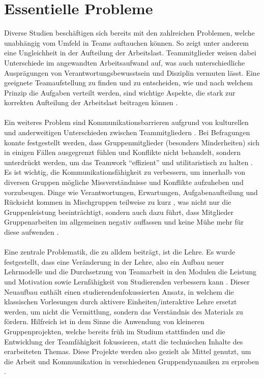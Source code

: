 \documentclass[a4paper]{article}
\begin{document}
\section{Essentielle Probleme}
Diverse Studien beschäftigen sich bereits mit den zahlreichen Problemen, welche unabhängig vom Umfeld in Teams auftauchen können. So zeigt \cite{balanced_teamwork_scrum} unter anderem eine Ungleichheit in der Aufteilung der Arbeitslast. Teammitglieder weisen dabei Unterschiede im angewandten Arbeitsaufwand auf, was auch unterschiedliche Ausprägungen von Verantwortungsbewusstsein und Disziplin vermuten lässt. Eine geeignete Teamaufstellung zu finden und zu entscheiden, wie und nach welchem Prinzip die Aufgaben verteilt werden, sind wichtige Aspekte, die stark zur korrekten Aufteilung der Arbeitslast beitragen können \cite{teamworkstrat_firstsem_engineering}.
\\\\
Ein weiteres Problem sind Kommunikationsbarrieren aufgrund von kulturellen und anderweitigen Unterschieden zwischen Teammitgliedern \cite{Multicultural_miscommunication}. Bei Befragungen konnte festgestellt werden, dass Gruppenmitglieder (besonders Minderheiten) sich in einigen Fällen ausgegrenzt fühlen und Konflikte nicht behandelt, sondern unterdrückt werden, um das Teamwork "`effizient"' und utilitaristisch zu halten \cite{inclusivity_teamwork_southafrica}. Es ist wichtig, die Kommunikationsfähigkeit zu verbessern, um innerhalb von diversen Gruppen mögliche Missverständnisse und Konflikte aufzuheben und vorzubeugen. Dinge wie Verantwortungen, Erwartungen, Aufgabenaufteilung und Rücksicht kommen in Mischgruppen teilweise zu kurz \cite{gender_differences}, was nicht nur die Gruppenleistung beeinträchtigt, sondern auch dazu führt, dass Mitglieder Gruppenarbeiten im allgemeinen negativ auffassen und keine Mühe mehr für diese aufwenden \cite{teamwork_teaching_engineering_china}.
\\\\
Eine zentrale Problematik, die zu alldem beiträgt, ist die Lehre. Es wurde festgestellt, dass eine Veränderung in der Lehre, also ein Aufbau neuer Lehrmodelle und die Durchsetzung von Teamarbeit in den Modulen die Leistung und Motivation sowie Lernfähigkeit von Studierenden verbessern kann \cite{blended_teaching_innovationability}. Dieser Neuaufbau enthält einen studierendenfokussierten Ansatz, in welchem die klassischen Vorlesungen durch aktivere Einheiten/interaktive Lehre ersetzt werden, um nicht die Vermittlung, sondern das Verständnis des Materials zu fördern.
Hilfreich ist in dem Sinne die Anwendung von kleineren Gruppenprojekten, welche bereits früh im Studium stattfinden und die Entwicklung der Teamfähigkeit fokussieren, statt die technischen Inhalte des erarbeiteten Themas. Diese Projekte werden also gezielt als Mittel genutzt, um die Arbeit und Kommunikation in verschiedenen Gruppendynamiken zu erproben \cite{4Cs_teamwork_china}.
\end{document}
